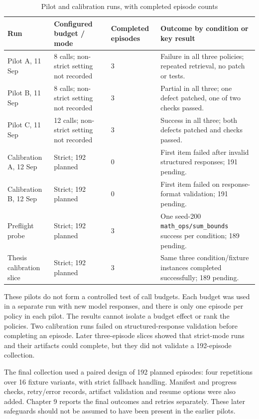 \documentclass[12pt,a4paper,oneside]{report}
\begin{document}
\begin{table}[htbp]
\centering
\small
\setlength{\tabcolsep}{4pt}
\begin{tabularx}{\linewidth}{|Y|Y|Y|Y|}
\hline
\textbf{Run} & \textbf{Configured budget / mode} & \textbf{Completed episodes} & \textbf{Outcome by condition or key result} \\
\hline
Pilot A, 11 Sep & 8 calls; non-strict setting not recorded & 3 & Failure in all three policies; repeated retrieval, no patch or tests. \\
\hline
Pilot B, 11 Sep & 8 calls; non-strict setting not recorded & 3 & Partial in all three; one defect patched, one of two checks passed. \\
\hline
Pilot C, 11 Sep & 12 calls; non-strict setting not recorded & 3 & Success in all three; both defects patched and checks passed. \\
\hline
Calibration A, 12 Sep & Strict; 192 planned & 0 & First item failed after invalid structured responses; 191 pending. \\
\hline
Calibration B, 12 Sep & Strict; 192 planned & 0 & First item failed on response-format validation; 191 pending. \\
\hline
Preflight probe & Strict; 192 planned & 3 & One seed-200 \texttt{math\allowbreak\_ops/sum\allowbreak\_bounds} success per condition; 189 pending. \\
\hline
Thesis calibration slice & Strict; 192 planned & 3 & Same three condition/fixture instances completed successfully; 189 pending. \\
\hline
\end{tabularx}
\caption{Pilot and calibration runs, with completed episode counts}
\end{table}
These pilots do not form a controlled test of call budgets. Each budget was used in a separate run with new model responses, and there is only one episode per policy in each pilot. The results cannot isolate a budget effect or rank the policies. Two calibration runs failed on structured-response validation before completing an episode. Later three-episode slices showed that strict-mode runs and their artifacts could complete, but they did not validate a 192-episode collection.

The final collection used a paired design of 192 planned episodes: four repetitions over 16 fixture variants, with strict fallback handling. Manifest and progress checks, retry/error records, artifact validation and resume options were also added. Chapter 9 reports the final outcomes and retries separately. These later safeguards should not be assumed to have been present in the earlier pilots.
\end{document}
